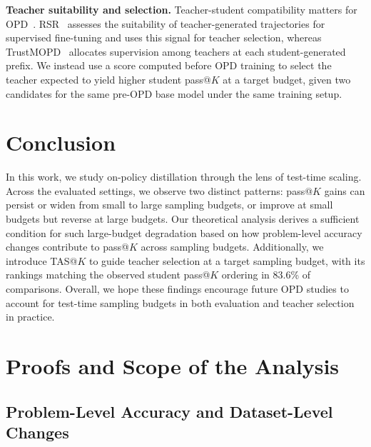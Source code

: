 \documentclass{article}
\theoremstyle{opdplain}
\begin{document}
\noindent\textbf{Teacher suitability and selection.} Teacher-student compatibility matters for OPD~\citep{li2026rethinkingopd}. RSR~\citep{yang2026informativealignment} assesses the suitability of teacher-generated trajectories for supervised fine-tuning and uses this signal for teacher selection, whereas TrustMOPD~\citep{sun2026trustmopd} allocates supervision among teachers at each student-generated prefix. We instead use a score computed before OPD training to select the teacher expected to yield higher student pass@$K$ at a target budget, given two candidates for the same pre-OPD base model under the same training setup.

\section{Conclusion}
\label{sec:conclusion}
In this work, we study on-policy distillation through the lens of test-time scaling. Across the evaluated settings, we observe two distinct patterns: pass@$K$ gains can persist or widen from small to large sampling budgets, or improve at small budgets but reverse at large budgets. Our theoretical analysis derives a sufficient condition for such large-budget degradation based on how problem-level accuracy changes contribute to pass@$K$ across sampling budgets. Additionally, we introduce TAS@$K$ to guide teacher selection at a target sampling budget, with its rankings matching the observed student pass@$K$ ordering in 83.6\% of comparisons. Overall, we hope these findings encourage future OPD studies to account for test-time sampling budgets in both evaluation and teacher selection in practice.

\renewcommand{\topfraction}{0.70}
\renewcommand{\dbltopfraction}{0.70}
\renewcommand{\textfraction}{0.20}
\renewcommand{\floatpagefraction}{0.50}
\setcounter{bottomnumber}{1}
\setcounter{totalnumber}{3}



\appendix
\clearpage

\section{Proofs and Scope of the Analysis}
\label{app:opd-theory}

\subsection{Problem-Level Accuracy and Dataset-Level Changes}
\label{app:opd-metric-proof}
\end{document}
